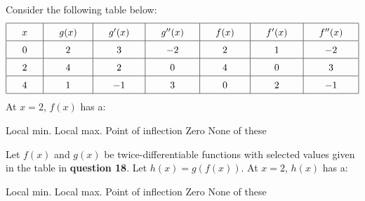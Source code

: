 \begin{questions}
    \question Consider the following table below: \begin{align*}
        \arraycolsep=16.5pt\def\arraystretch{1.5}
        \begin{array}{|c|c|c|c|c|c|c|c|c|}
            \hline
            x & g(x) & g'(x) & g''(x) & f(x) & f'(x) & f''(x) \\ \hline
            0 & 2 & 3 & -2 & 2 & 1 & -2 \\ \hline
            2 & 4 & 2 & 0 & 4 & 0 & 3 \\ \hline
            4 & 1 & -1 & 3 & 0 & 2 & -1 \\
            \hline 
        \end{array}
    \end{align*}
    At $x = 2$, $f(x)$ has a: \\

    \begin{oneparchoices}
        \choice Local min.
        \choice Local max.
        \choice Point of inflection
        \choice Zero
        \choice None of these
    \end{oneparchoices} \par \horizontalline

    \question Let $f(x)$ and $g(x)$ be twice-differentiable functions with selected values given in the table in \textbf{question 18}. Let $h(x) = g(f(x))$. At $x = 2$, $h(x)$ has a: \\

    \begin{oneparchoices}
        \choice Local min.
        \choice Local max.
        \choice Point of inflection
        \choice Zero
        \choice None of these
    \end{oneparchoices} \par \horizontalline
\end{questions}

